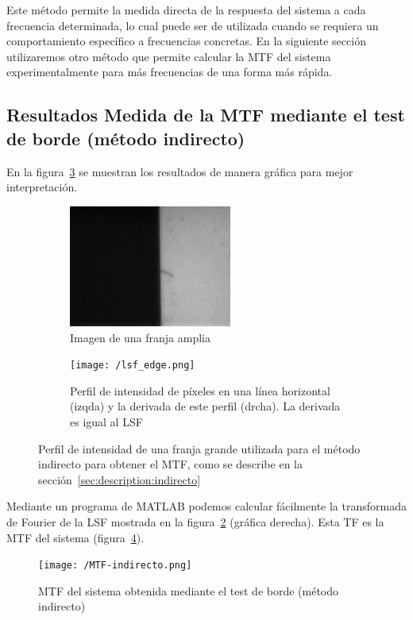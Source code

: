 \documentclass{./packages/optica-article}
\begin{document}
Este método permite la medida directa de la respuesta del sistema a cada frecuencia determinada, lo cual puede ser de utilizada cuando se requiera un comportamiento específico a frecuencias concretas. En la siguiente sección utilizaremos otro método que permite calcular la MTF del sistema experimentalmente para más frecuencias de una forma más rápida.





\subsection{Resultados Medida de la MTF mediante el test de borde (método indirecto)}\label{sec:resultados:indirecto}


En la figura~\ref{fig:perfil} se muestran los resultados de manera gráfica para mejor interpretación.
\begin{figure}[hptb]
	\centering
	\begin{subfigure}[t]{0.35\textwidth}
		\centering
		\includegraphics[height=4cm]{edge_large_line}
		\caption{Imagen de una franja amplia}\label{fig:perfil:img}
	\end{subfigure}
	\quad
	\begin{subfigure}[t]{0.60\textwidth}
		\centering
		\texttt{[image: /lsf\_edge.png]}
		\caption{Perfil de intensidad de píxeles en una línea horizontal (izqda) y la derivada de este perfil (drcha). La derivada es igual al LSF}\label{fig:perfil:graph}
	\end{subfigure}
	\caption{Perfil de intensidad de una franja grande utilizada para el método indirecto para obtener el MTF, como se describe en la sección~\ref{sec:description:indirecto}}\label{fig:perfil}
\end{figure}

Mediante un programa de MATLAB podemos calcular fácilmente la transformada de Fourier de la LSF mostrada en la figura~\ref{fig:perfil:graph} (gráfica derecha). Esta TF es la MTF del sistema (figura~\ref{fig:mtf-indirecto}).

\begin{figure}
	\centering
	\texttt{[image: /MTF-indirecto.png]}
	\caption{MTF del sistema obtenida mediante el test de borde (método indirecto)}
	\label{fig:mtf-indirecto}
\end{figure}
\end{document}
